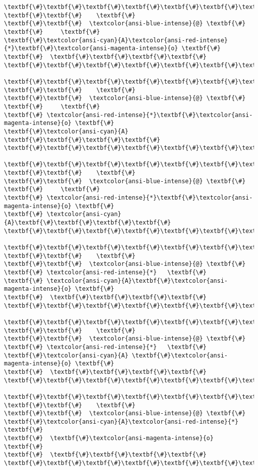 \documentclass[11pt]{article}
\begin{document}
\begin{Verbatim}[commandchars=\\\{\}]
\textbf{\#}\textbf{\#}\textbf{\#}\textbf{\#}\textbf{\#}\textbf{\#}\textbf{\#}
\textbf{\#}\textbf{\#}    \textbf{\#}
\textbf{\#}\textbf{\#}  \textcolor{ansi-blue-intense}{@} \textbf{\#}
\textbf{\#}     \textbf{\#}
\textbf{\#}\textcolor{ansi-cyan}{A}\textcolor{ansi-red-intense}{*}\textbf{\#}\textcolor{ansi-magenta-intense}{o} \textbf{\#}
\textbf{\#}  \textbf{\#}\textbf{\#}\textbf{\#}\textbf{\#}
\textbf{\#}\textbf{\#}\textbf{\#}\textbf{\#}\textbf{\#}\textbf{\#}\textbf{\#}

\textbf{\#}\textbf{\#}\textbf{\#}\textbf{\#}\textbf{\#}\textbf{\#}\textbf{\#}
\textbf{\#}\textbf{\#}    \textbf{\#}
\textbf{\#}\textbf{\#}  \textcolor{ansi-blue-intense}{@} \textbf{\#}
\textbf{\#}     \textbf{\#}
\textbf{\#} \textcolor{ansi-red-intense}{*}\textbf{\#}\textcolor{ansi-magenta-intense}{o} \textbf{\#}
\textbf{\#}\textcolor{ansi-cyan}{A} \textbf{\#}\textbf{\#}\textbf{\#}\textbf{\#}
\textbf{\#}\textbf{\#}\textbf{\#}\textbf{\#}\textbf{\#}\textbf{\#}\textbf{\#}

\textbf{\#}\textbf{\#}\textbf{\#}\textbf{\#}\textbf{\#}\textbf{\#}\textbf{\#}
\textbf{\#}\textbf{\#}    \textbf{\#}
\textbf{\#}\textbf{\#}  \textcolor{ansi-blue-intense}{@} \textbf{\#}
\textbf{\#}     \textbf{\#}
\textbf{\#} \textcolor{ansi-red-intense}{*}\textbf{\#}\textcolor{ansi-magenta-intense}{o} \textbf{\#}
\textbf{\#} \textcolor{ansi-cyan}{A}\textbf{\#}\textbf{\#}\textbf{\#}\textbf{\#}
\textbf{\#}\textbf{\#}\textbf{\#}\textbf{\#}\textbf{\#}\textbf{\#}\textbf{\#}

\textbf{\#}\textbf{\#}\textbf{\#}\textbf{\#}\textbf{\#}\textbf{\#}\textbf{\#}
\textbf{\#}\textbf{\#}    \textbf{\#}
\textbf{\#}\textbf{\#}  \textcolor{ansi-blue-intense}{@} \textbf{\#}
\textbf{\#} \textcolor{ansi-red-intense}{*}   \textbf{\#}
\textbf{\#} \textcolor{ansi-cyan}{A}\textbf{\#}\textcolor{ansi-magenta-intense}{o} \textbf{\#}
\textbf{\#}  \textbf{\#}\textbf{\#}\textbf{\#}\textbf{\#}
\textbf{\#}\textbf{\#}\textbf{\#}\textbf{\#}\textbf{\#}\textbf{\#}\textbf{\#}

\textbf{\#}\textbf{\#}\textbf{\#}\textbf{\#}\textbf{\#}\textbf{\#}\textbf{\#}
\textbf{\#}\textbf{\#}    \textbf{\#}
\textbf{\#}\textbf{\#}  \textcolor{ansi-blue-intense}{@} \textbf{\#}
\textbf{\#} \textcolor{ansi-red-intense}{*}   \textbf{\#}
\textbf{\#}\textcolor{ansi-cyan}{A} \textbf{\#}\textcolor{ansi-magenta-intense}{o} \textbf{\#}
\textbf{\#}  \textbf{\#}\textbf{\#}\textbf{\#}\textbf{\#}
\textbf{\#}\textbf{\#}\textbf{\#}\textbf{\#}\textbf{\#}\textbf{\#}\textbf{\#}

\textbf{\#}\textbf{\#}\textbf{\#}\textbf{\#}\textbf{\#}\textbf{\#}\textbf{\#}
\textbf{\#}\textbf{\#}    \textbf{\#}
\textbf{\#}\textbf{\#}  \textcolor{ansi-blue-intense}{@} \textbf{\#}
\textbf{\#}\textcolor{ansi-cyan}{A}\textcolor{ansi-red-intense}{*}   \textbf{\#}
\textbf{\#}  \textbf{\#}\textcolor{ansi-magenta-intense}{o} \textbf{\#}
\textbf{\#}  \textbf{\#}\textbf{\#}\textbf{\#}\textbf{\#}
\textbf{\#}\textbf{\#}\textbf{\#}\textbf{\#}\textbf{\#}\textbf{\#}\textbf{\#}


\end{Verbatim}
\end{document}
